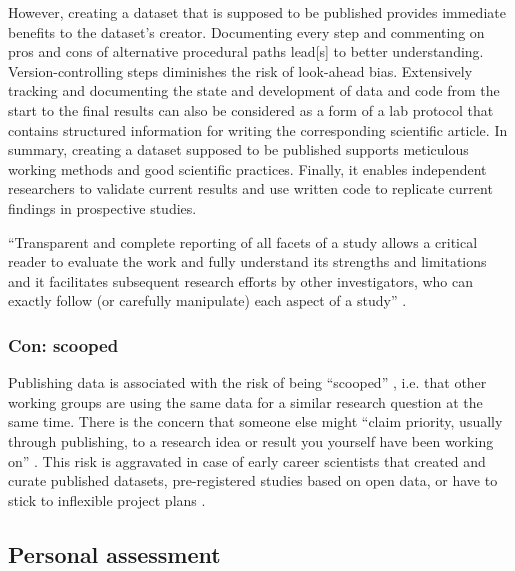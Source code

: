 %
However, creating a dataset that is supposed to be published provides immediate
benefits to the dataset's creator.
%
Documenting every step and commenting on pros and cons of alternative procedural
paths lead[s] to better understanding.
%
Version-controlling steps diminishes the risk of look-ahead bias.
%
Extensively tracking and documenting the state and development of data and code
from the start to the final results can also be considered as a form of a lab
protocol that contains structured information for writing the corresponding
scientific article.
%
In summary, creating a dataset supposed to be published supports meticulous
working methods and good scientific practices.
%
Finally, it enables independent researchers to validate current results and use
written code to replicate current findings in prospective studies.


``Transparent and complete reporting of all facets of a study allows a critical
reader to evaluate the work and fully understand its strengths and limitations
%
and it facilitates subsequent research efforts by other investigators, who can
exactly follow (or carefully manipulate) each aspect of a study''
\citep{nichols2017best}.




\subsubsection{Con: scooped}


%
Publishing data is associated with the risk of being ``scooped''
\citep[cf.][]{laine2017afraid}, i.e. that other working groups are using the
same data for a similar research question at the same time.
%
There is the concern that someone else might ``claim priority, usually through
publishing, to a research idea or result you yourself have been working on''
\citep{laine2017afraid}.
%
This risk is aggravated in case of early career scientists that created and
curate published datasets, pre-registered studies based on open data, or have to
stick to inflexible project plans \citep[cf.][]{toribio2021early}.



\pagebreak


\subsection{Personal assessment}

